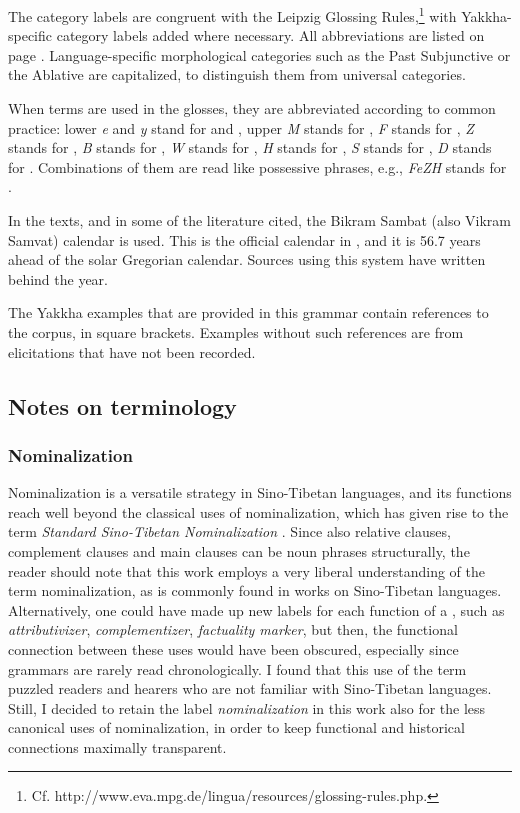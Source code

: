 The category labels are congruent with the Leipzig Glossing Rules,\footnote{Cf. http://www.eva.mpg.de/lingua/resources/glossing-rules.php.} with Yakkha-specific category labels added where necessary. All abbreviations are listed on page \pageref{abbreviations}. Language-specific morphological categories such as the Past Subjunctive  or the Ablative  are capitalized, to distinguish them from universal categories.

When  terms are used in the glosses, they are abbreviated according to common practice: lower   \emph{e} and \emph{y} stand for  and , upper  \emph{M} stands for , \emph{F} stands for , \emph{Z} stands for , \emph{B} stands for , \emph{W} stands for , \emph{H} stands for , \emph{S} stands for , \emph{D} stands for . Combinations of them are read like possessive phrases, e.g., \emph{FeZH} stands for . 


In the texts, and in some of the  literature cited, the Bikram Sambat (also Vikram Samvat) calendar is used. This is the official calendar in , and it is  56.7 years ahead of the solar Gregorian calendar. Sources using this system have  written behind the year.

The Yakkha examples that are provided in this grammar contain references to the corpus, in square brackets. Examples without such references are from elicitations that have not been recorded.


\subsection{Notes on terminology}\label{terminology}

\subsubsection{Nominalization}

Nominalization is a versatile strategy in Sino-Tibetan languages, and its functions reach well beyond the classical uses of nominalization, which has given rise to the term \emph{Standard Sino-Tibetan Nominalization} \citep{Bickel1999Nominalization}. Since also relative clauses, complement clauses and main clauses can be noun phrases structurally, the reader should note that this work employs a very liberal understanding of the term nominalization, as is commonly found in works on Sino-Tibetan languages. Alternatively, one could have made up new labels for each function of  a , such as \emph{attributivizer}, \emph{complementizer}, \emph{factuality marker}, but then, the functional connection between these uses would have been obscured, especially since grammars are rarely read chronologically. I found that this use of the term puzzled readers and hearers who are not familiar with Sino-Tibetan languages. Still, I decided to retain the label \emph{nominalization} in this work also for the less canonical uses of nominalization, in order to keep functional and historical connections maximally transparent.


